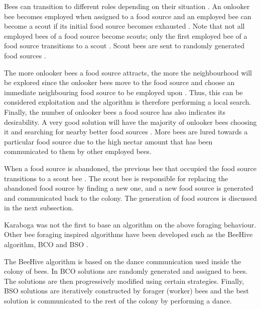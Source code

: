 Bees can transition to different roles depending on their situation \cite{ABCCompareStudy,ABCNumericalOptimization}. An onlooker bee becomes employed when assigned to a food source and an employed bee can become a scout if its initial food source becomes exhausted \cite{ABCImageEnhancement,ABCCompareStudy,ABCReconfigDistro}. Note that not all employed bees of a food source become scouts; only the first employed bee of a food source transitions to a scout \cite{ABCImageEnhancement,ABCCompareStudy,ABCReconfigDistro}. Scout bees are sent to randomly generated food sources \cite{ABCImageEnhancement,ABCCompareStudy,ABCReconfigDistro}. 

The more onlooker bees a food source attracts, the more the neighbourhood will be explored since the onlooker bees move to the food source and choose an immediate neighbouring food source to be employed upon \cite{ABCCompareStudy,ABCNumericalOptimization}. Thus, this can be considered exploitation and the algorithm is therefore performing a local search\cite{ABCCompareStudy,ABCReconfigDistro,ABCNumericalOptimization}. Finally, the number of onlooker bees a food source has also indicates its desirability. A very good solution will have the majority of onlooker bees choosing it and searching for nearby better food sources \cite{ABCCompareStudy,ABCReconfigDistro,ABCNumericalOptimization}. More bees are lured towards a particular food source due to the high nectar amount that has been communicated to them by other employed bees\cite{ABCCompareStudy,ABCReconfigDistro,ABCNumericalOptimization}.

When a food source is abandoned, the previous bee that occupied the food source transitions to a scout bee \cite{ABCCompareStudy,ABCNumericalOptimization}. The scout bee is responsible for replacing the abandoned food source by finding a new one, and a new food source is generated and communicated back to the colony\cite{ABCCompareStudy,ABCImageEnhancement,ABCNumericalOptimization}. The generation of food sources is discussed in the next subsection.

Karaboga was not the first to base an algorithm on the above foraging behaviour. Other bee foraging inspired algorithms have been developed such as the BeeHive algorithm, \gls{BCO} and \gls{BSO} \cite{BCO,HybridABCClustering,ABCNumericalOptimization}. 

The BeeHive algorithm is based on the dance communication used inside the colony of bees. In \gls{BCO} solutions are randomly generated and assigned to bees\cite{HybridABCClustering,ABCNumericalOptimization}. The solutions are then progressively modified using certain strategies. Finally, \gls{BSO} solutions are iteratively constructed by forager (worker) bees and the best solution is communicated to the rest of the colony by performing a dance\cite{HybridABCClustering,ABCNumericalOptimization}.

